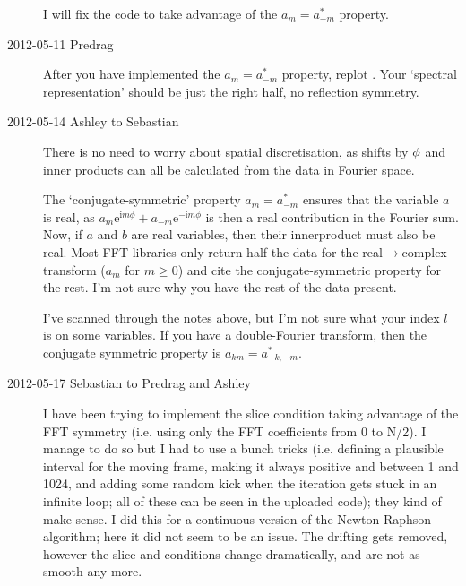 \begin{description}
I will fix the code to take advantage of the $a_m=a^*_{-m}$ property.

\item[2012-05-11 Predrag]
After you have implemented the $a_m=a^*_{-m}$ property, replot
. Your `spectral representation' should be just the
right half, no reflection symmetry.

\item[2012-05-14 Ashley to Sebastian]
There is no need to worry about spatial discretisation,
as shifts by ${\bf \phi}$ and inner products can all be calculated from
the data in Fourier space.

The `conjugate-symmetric' property $a_m=a^*_{-m}$ ensures that the variable $a$ is real, as
$a_m\mathrm{e}^{\mathrm{i}m\phi}
+a_{-m}\mathrm{e}^{-\mathrm{i}m\phi}$ is then a real contribution in the Fourier sum.
Now, if $a$ and $b$ are real variables, then their innerproduct must
also be real.
Most FFT libraries only return half the data for the real$\to$complex
transform ($a_m$ for $m\ge0$) and cite the conjugate-symmetric property for the rest.  I'm not sure why you have the rest of the data present.

I've scanned through the notes above, but I'm not sure what your index
$l$ is on some variables.  If you have a double-Fourier transform,
then the conjugate symmetric property is
$a_{km}=a^*_{-k,-m}$.

\item[2012-05-17 Sebastian to Predrag and Ashley]
I have been trying to implement the slice condition taking advantage of
the FFT symmetry (i.e. using only the FFT coefficients from 0 to N/2). I
manage to do so but I had to use a bunch tricks (i.e. defining a
plausible interval for the moving frame, making it always positive and
between 1 and 1024, and adding some random kick when the iteration gets
stuck in an infinite loop; all of these can be seen in the uploaded
code); they kind of make sense. I did this for a continuous version of
the Newton-Raphson algorithm; here it did not seem to be an issue. The
drifting gets removed, however the slice and {\chartBord} conditions
change dramatically, and are not as smooth any more.


\end{description}
